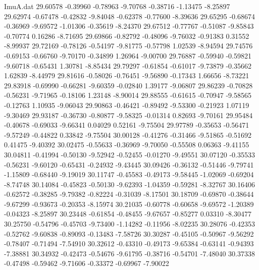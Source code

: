 \begin{filecontents}{ImuA.dat}
  29.60578   -0.39960   -0.78963   -9.70768   -0.38716   -1.13475   -8.25897
  29.62974   -0.67478   -0.42832   -9.84048   -0.62378   -0.77600   -8.39636
  29.65295   -0.68674   -0.36969   -9.69572   -1.01306   -0.35619   -8.24370
  29.67512   -0.77767   -0.51087   -9.85843   -0.70774    0.16286   -8.71695
  29.69866   -0.82792   -0.48096   -9.76032   -0.91383    0.31552   -8.99937
  29.72169   -0.78126   -0.54197   -9.81775   -0.57798    1.02539   -8.94594
  29.74576   -0.69153   -0.66760   -9.70170   -0.34899    1.26964   -9.00700
  29.76887   -0.59940   -0.59821   -9.60718   -0.65431    1.30781   -8.85434
  29.79297   -0.61854   -0.61017   -9.73879   -0.35662    1.62839   -8.44979
  29.81616   -0.58026   -0.76451   -9.56890   -0.17343    1.66656   -8.73221
  29.83918   -0.69990   -0.66281   -9.60359   -0.02840    1.39177   -9.06807
  29.86239   -0.70828   -0.56231   -9.71965   -0.18106    1.23148   -8.90014
  29.88555   -0.61615   -0.70947   -9.58565   -0.12763    1.10935   -9.06043
  29.90863   -0.46421   -0.89492   -9.53300   -0.21923    1.07119   -9.30469
  29.93187   -0.36730   -0.80877   -9.58325   -0.01314    0.82693   -9.70161
  29.95484   -0.40678   -0.69033   -9.66341    0.04029    0.52161   -9.75504
  29.97789   -0.35653   -0.56471   -9.57249   -0.44822    0.33842   -9.75504
  30.00128   -0.41276   -0.31466   -9.51865   -0.51692    0.41475   -9.40392
  30.02475   -0.55633   -0.36969   -9.70050   -0.55508    0.06363   -9.41155
  30.04811   -0.41994   -0.50130   -9.52942   -0.52455   -0.01270   -9.49551
  30.07120   -0.35533   -0.56231   -9.60120   -0.65431   -0.24932   -9.43445
  30.09426   -0.36132   -0.51446   -9.79741   -1.15809   -0.68440   -9.19019
  30.11747   -0.45583   -0.49173   -9.58445   -1.02069   -0.69204   -8.74748
  30.14084   -0.45823   -0.50130   -9.62393   -1.04359   -0.59281   -8.32767
  30.16406   -0.62572   -0.38285   -9.79382   -0.82224   -0.31039   -8.17501
  30.18709   -0.69870   -0.38644   -9.67299   -0.93673   -0.20353   -8.15974
  30.21035   -0.60778   -0.60658   -9.69572   -1.20389   -0.04323   -8.25897
  30.23448   -0.61854   -0.48455   -9.67657   -0.85277    0.03310   -8.30477
  30.25750   -0.54796   -0.45703   -9.73400   -1.14282   -0.11956   -8.02235
  30.28076   -0.42353   -0.52762   -9.60838   -0.89093   -0.13483   -7.58726
  30.30287   -0.45105   -0.50967   -9.56292   -0.78407   -0.71494   -7.54910
  30.32612   -0.43310   -0.49173   -9.65384   -0.63141   -0.94393   -7.38881
  30.34932   -0.42473   -0.54676   -9.61795   -0.38716   -0.54701   -7.48040
  30.37338   -0.47498   -0.59462   -9.71606   -0.33372   -0.69967   -7.90022

\end{filecontents}
